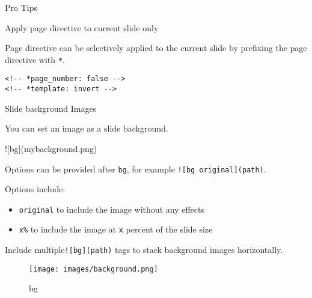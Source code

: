 \documentclass[ignorenonframetext,]{beamer}
\newenvironment{Shaded}{\begin{snugshade}}{\end{snugshade}}
\newcommand{\NormalTok}[1]{{#1}}
\providecommand{\tightlist}{%
  \setlength{\itemsep}{0pt}\setlength{\parskip}{0pt}}
\begin{document}
\begin{frame}[fragile]

\begin{block}{Pro Tips}

\begin{block}{Apply page directive to current slide only}

Page directive can be selectively applied to the current slide by
prefixing the page directive with \texttt{*}.

\begin{verbatim}
<!-- *page_number: false -->
<!-- *template: invert -->
\end{verbatim}

\end{block}

\end{block}

\end{frame}

\begin{frame}[fragile]

\begin{block}{Slide background Images}

You can set an image as a slide background.

\begin{Shaded}
\begin{Highlighting}[]
\NormalTok{![bg](mybackground.png)}
\end{Highlighting}
\end{Shaded}

Options can be provided after \texttt{bg}, for example
\texttt{!{[}bg\ original{]}(path)}.

Options include:

\begin{itemize}
\tightlist
\item
  \texttt{original} to include the image without any effects
\item
  \texttt{x\%} to include the image at \texttt{x} percent of the slide
  size
\end{itemize}

Include multiple\texttt{!{[}bg{]}(path)} tags to stack background images
horizontally.

\begin{figure}[htbp]
\centering
\texttt{[image: images/background.png]}
\caption{bg}
\end{figure}

\end{block}

\end{frame}
\end{document}
